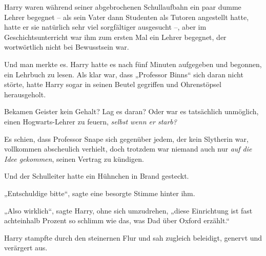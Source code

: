 Harry waren während seiner abgebrochenen Schullaufbahn ein paar dumme Lehrer begegnet – als sein Vater dann Studenten als Tutoren angestellt hatte, hatte er sie natürlich sehr viel sorgfältiger ausgesucht –, aber im Geschichtsunterricht war ihm zum ersten Mal ein Lehrer begegnet, der wortwörtlich nicht bei Bewusstsein war.

Und man merkte es. Harry hatte es nach fünf Minuten aufgegeben und begonnen, ein Lehrbuch zu lesen. Als klar war, dass „Professor Binns“ sich daran nicht störte, hatte Harry sogar in seinen Beutel gegriffen und Ohrenstöpsel herausgeholt.

Bekamen Geister kein Gehalt? Lag es daran? Oder war es tatsächlich unmöglich, einen Hogwarts-Lehrer zu feuern, \emph{selbst wenn er starb?}

Es schien, dass Professor Snape sich gegenüber jedem, der kein Slytherin war, vollkommen abscheulich verhielt, doch trotzdem war niemand auch nur \emph{auf die Idee gekommen}, seinen Vertrag zu kündigen.

Und der Schulleiter hatte ein Hühnchen in Brand gesteckt.

„Entschuldige bitte“, sagte eine besorgte Stimme hinter ihm.

„Also wirklich“, sagte Harry, ohne sich umzudrehen, „diese Einrichtung ist fast achteinhalb Prozent so schlimm wie das, was Dad über Oxford erzählt.“

\later

Harry stampfte durch den steinernen Flur und sah zugleich beleidigt, genervt und verärgert aus.

